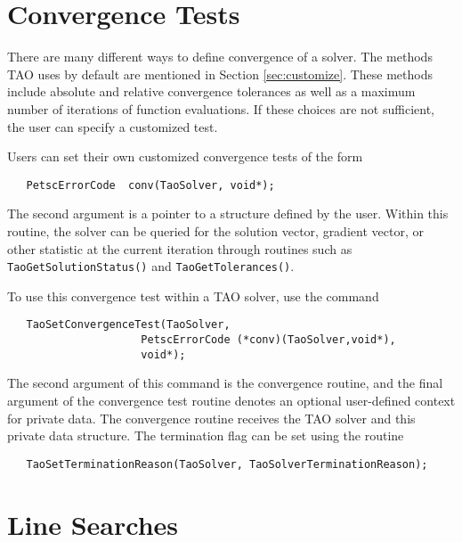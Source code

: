 



\section{Convergence Tests}
\label{sec:Taoconvergence}

There are many different ways to define convergence of a solver.
The methods TAO uses by default are mentioned in 
Section \ref{sec:customize}.
These methods include absolute and relative convergence tolerances as well
as a maximum number of iterations of function evaluations.
If these choices are not sufficient, 
the user can specify a customized test. 

Users can set their own customized convergence tests of the form
\begin{verbatim}
   PetscErrorCode  conv(TaoSolver, void*);
\end{verbatim}
\noindent
The second argument is a pointer to a structure defined by the user.
Within this routine, the solver
can be queried for the solution vector, gradient vector,
or other statistic at the current iteration through routines such as
{\tt TaoGetSolutionStatus()} and  {\tt TaoGetTolerances()}.

To use this convergence test within a TAO solver, use
the command 
\begin{verbatim}
   TaoSetConvergenceTest(TaoSolver,
                     PetscErrorCode (*conv)(TaoSolver,void*),
                     void*);
\end{verbatim}
\noindent
The second argument of this command is the convergence routine, and the
final argument of the convergence test routine denotes an optional 
user-defined context for private data.  
The convergence routine receives the TAO solver and this private data
structure. 
The termination flag can be set using the routine
\begin{verbatim}
   TaoSetTerminationReason(TaoSolver, TaoSolverTerminationReason);
\end{verbatim}
\noindent



\section{Line Searches} 
\label{sec:TaoLineSearch}

